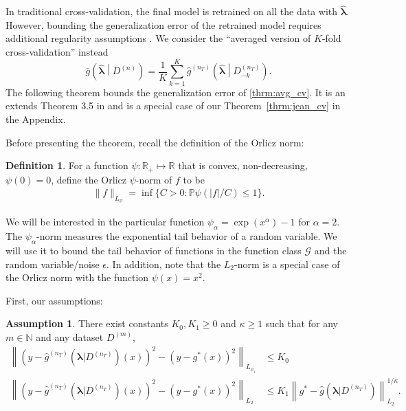 \documentclass[12pt]{article} %
\theoremstyle{definition}
\newtheorem{definition}{Definition}
\newtheorem{assump}{Assumption}
\begin{document}
In traditional cross-validation, the final model is retrained on all the data with $\hat{\boldsymbol{\lambda}}$. However, bounding the generalization error of the retrained model requires additional regularity assumptions \citep{lecue2012oracle}. We consider the ``averaged version of $K$-fold cross-validation'' instead
\begin{equation}
\label{thrm:avg_cv}
\bar{g}\left ( \hat{\boldsymbol \lambda} \middle | {D^{(n)}} \right ) = 
\frac{1}{K} \sum_{k=1}^K 
\hat{g}^{(n_T)} \left (\hat{\boldsymbol \lambda} \middle | D^{(n_T)}_{-k} \right ).
\end{equation}
The following theorem bounds the generalization error of \eqref{thrm:avg_cv}. It is an extends Theorem 3.5 in \citet{lecue2012oracle} and is a special case of our Theorem~\ref{thrm:jean_cv} in the Appendix.

Before presenting the theorem, recall the definition of the Orlicz norm:
\begin{definition}
	For a function $\psi: \mathbb{R}_+ \mapsto \mathbb{R}$ that is convex, non-decreasing, $\psi(0) = 0$, define the Orlicz $\psi$-norm of $f$ to be
	\begin{align}
	\|f\|_{L_\psi} = \inf \{C > 0: \mathbb{P}\psi(|f|/C) \le 1\}.
	\end{align}
\end{definition}
We will be interested in the particular function $\psi_\alpha = \exp(x^\alpha) - 1 $ for $\alpha = 2$.
The $\psi_\alpha$-norm measures the exponential tail behavior of a random variable.
We will use it to bound the tail behavior of functions in the function class $\mathcal{G}$ and the random variable/noise $\epsilon$.
In addition, note that the $L_2$-norm is a special case of the Orlicz norm with the function $\psi(x) = x^2$.

First, our assumptions:
\begin{assump}
	\label{assump:tail_margin}
	There exist constants $K_0, K_1 \ge 0$ and $\kappa \ge 1$ such that for any $m \in \mathbb{N}$ and any dataset $D^{(m)}$,
	\begin{align}
	\left \|
	\left(
	y - \hat{g}^{(n_T)}(\boldsymbol{\lambda} | D^{(n_T)})(x)
	\right)^2
	- \left(
	y - g^*(x)
	\right)^2 \right \|_{L_{\psi_1}} & \le K_0
	\label{eq:cv_assump1}\\
	\left \|
	\left(
	y - \hat{g}^{(n_T)}(\boldsymbol{\lambda} | D^{(n_T)})(x)
	\right)^2
	- \left(
	y - g^*(x)
	\right)^2
	\right \|_{L_2}
	& \le 
	K_1 \left \|
	g^{*}-\hat{g}(\boldsymbol{\lambda}|D^{(n_{T})})
	\right \|_{L_{2}}^{1/\kappa}.
	\label{eq:cv_assump2}
	\end{align}
\end{assump}
\end{document}
